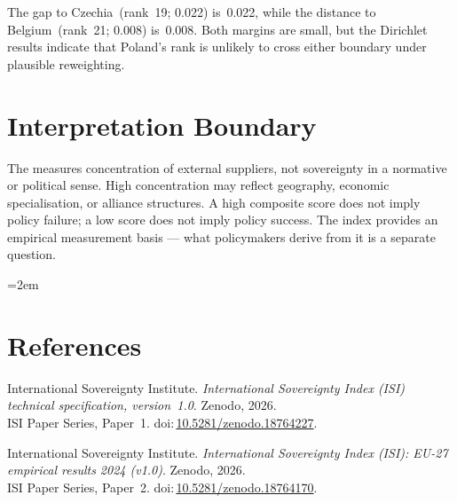 \documentclass[12pt,a4paper]{article}
\begin{document}
The gap to Czechia~(rank~19; 0.022) is~0.022, while the distance to Belgium~(rank~21; 0.008) is~0.008.  Both margins are small, but the Dirichlet results indicate that Poland's rank is unlikely to cross either boundary under plausible reweighting.


\section{Interpretation Boundary}
\label{sec:interpretation}

The \ISI measures concentration of external suppliers, not sovereignty in a normative or political sense.  High concentration may reflect geography, economic specialisation, or alliance structures.  A high composite score does not imply policy failure; a low score does not imply policy success.  The index provides an empirical measurement basis --- what policymakers derive from it is a separate question.


\clearpage
\vspace*{1.5cm}

\begingroup\emergencystretch=2em
\section*{References}

\begin{enumerate}[label={[\arabic*]},leftmargin=2em,itemsep=6pt]
\item International Sovereignty Institute.
  \textit{International Sovereignty Index (ISI) technical specification, version~1.0}.
  Zenodo, 2026.\\ISI Paper Series, Paper~1.
  doi:\,\href{https://doi.org/10.5281/zenodo.18764227}{10.5281/zenodo.18764227}.

\item International Sovereignty Institute.
  \textit{International Sovereignty Index (ISI): EU-27 empirical results 2024 (v1.0)}.
  Zenodo, 2026.\\ISI Paper Series, Paper~2.
  doi:\,\href{https://doi.org/10.5281/zenodo.18764170}{10.5281/zenodo.18764170}.
\end{enumerate}
\endgroup
\end{document}
